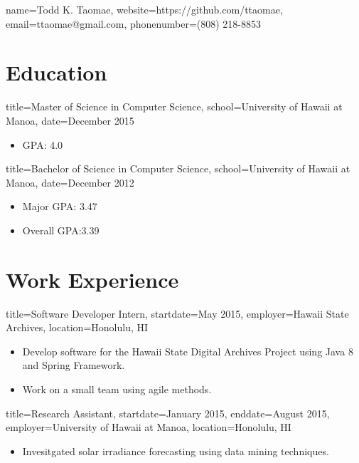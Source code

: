\documentclass{resume}
\begin{document}
\begin{header}{name=Todd K. Taomae,
            website=https://github.com/ttaomae,
            email=ttaomae@gmail.com,
            phonenumber=(808) 218-8853}
\end{header}

\section*{Education}
\begin{degree}{title=Master of Science in Computer Science,
               school=University of Hawaii at Manoa,
               date=December 2015}
    \begin{itemize}
        \item{GPA: 4.0}
    \end{itemize}
\end{degree}

\begin{degree}{title=Bachelor of Science in Computer Science,
               school=University of Hawaii at Manoa,
               date=December 2012}
    \begin{itemize}
        \item{Major GPA: 3.47}
        \item{Overall GPA:3.39}
    \end{itemize}
\end{degree}

\section*{Work Experience}
\begin{job}{title=Software Developer Intern,
            startdate=May 2015,
            employer=Hawaii State Archives,
            location={Honolulu, HI}}
    \begin{itemize}
        \item{Develop software for the Hawaii State Digital Archives Project using Java 8 and Spring Framework.}
        \item{Work on a small team using agile methods.}
    \end{itemize}
\end{job}

\begin{job}{title=Research Assistant,
            startdate=January 2015,
            enddate=August 2015,
            employer=University of Hawaii at Manoa,
            location={Honolulu, HI}}
    \begin{itemize}
        \item{Invesitgated solar irradiance forecasting using data mining techniques.}
    \end{itemize}
\end{job}
\end{document}
